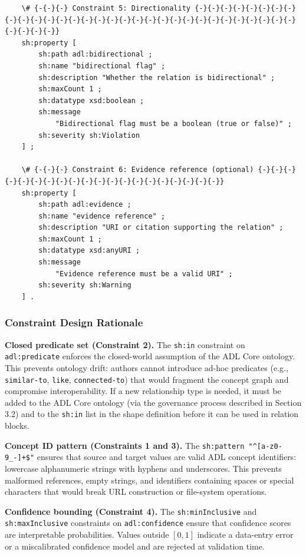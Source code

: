 \begin{lstlisting}
    \# {-{-}{-} Constraint 5: Directionality {-}{-}{-}{-}{-}{-}{-}{-}{-}{-}{-}{-}{-}{-}{-}{-}{-}{-}{-}{-}{-}{-}{-}{-}{-}{-}{-}{-}{-}{-}{-}{-}{-}{-}{-}}
    sh:property [
        sh:path adl:bidirectional ;
        sh:name "bidirectional flag" ;
        sh:description "Whether the relation is bidirectional" ;
        sh:maxCount 1 ;
        sh:datatype xsd:boolean ;
        sh:message
            "Bidirectional flag must be a boolean (true or false)" ;
        sh:severity sh:Violation
    ] ;

    \# {-{-}{-} Constraint 6: Evidence reference (optional) {-}{-}{-}{-}{-}{-}{-}{-}{-}{-}{-}{-}{-}{-}{-}{-}{-}{-}{-}{-}}
    sh:property [
        sh:path adl:evidence ;
        sh:name "evidence reference" ;
        sh:description "URI or citation supporting the relation" ;
        sh:maxCount 1 ;
        sh:datatype xsd:anyURI ;
        sh:message
            "Evidence reference must be a valid URI" ;
        sh:severity sh:Warning
    ] .
\end{lstlisting}

\subsubsection{Constraint Design Rationale}\label{b.3.1-constraint-design-rationale}

\textbf{Closed predicate set (Constraint 2).} The \texttt{sh:in} constraint on \texttt{adl:predicate} enforces the closed-world assumption of the ADL Core ontology. This prevents ontology drift: authors cannot introduce ad-hoc predicates (e.g., \texttt{similar-to}, \texttt{like}, \texttt{connected-to}) that would fragment the concept graph and compromise interoperability. If a new relationship type is needed, it must be added to the ADL Core ontology (via the governance process described in Section 3.2) and to the \texttt{sh:in} list in the shape definition before it can be used in relation blocks.

\textbf{Concept ID pattern (Constraints 1 and 3).} The \texttt{sh:pattern\ "\^{}{[}a-z0-9\_-{]}+\$"} ensures that source and target values are valid ADL concept identifiers: lowercase alphanumeric strings with hyphens and underscores. This prevents malformed references, empty strings, and identifiers containing spaces or special characters that would break URL construction or file-system operations.

\textbf{Confidence bounding (Constraint 4).} The \texttt{sh:minInclusive} and \texttt{sh:maxInclusive} constraints on \texttt{adl:confidence} ensure that confidence scores are interpretable probabilities. Values outside \([0, 1]\) indicate a data-entry error or a miscalibrated confidence model and are rejected at validation time.

